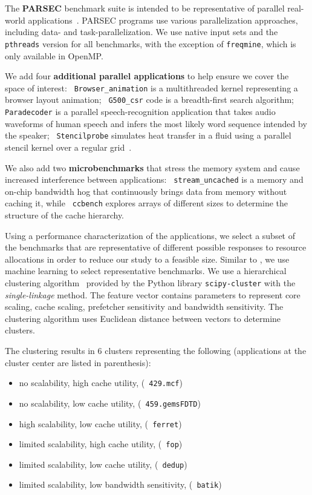 The \textbf{PARSEC} benchmark suite is intended to be representative
of parallel real-world applications~\cite{parsec}. PARSEC
programs use various parallelization approaches, including data- and
task-parallelization. We use native input sets and the \texttt{ pthreads} version for all benchmarks, with the exception of
\texttt{freqmine}, which is only available in OpenMP.

We add four \textbf{additional parallel applications} to help ensure
we cover the space of interest: \texttt{ Browser\_animation} is a
multithreaded kernel representing a browser layout animation; \texttt{
  G500\_csr} code is a breadth-first search algorithm; \texttt{ Paradecoder} is a parallel
speech-recognition application that takes audio waveforms of human
speech and infers the most likely word sequence intended by the
speaker; \texttt{ Stencilprobe} simulates heat transfer in a fluid
using a parallel stencil kernel over a regular
grid~\cite{Kamil:Stencilprobe}.

We also add two \textbf{microbenchmarks} that stress the memory
system and cause increased interference between applications: \texttt{ stream\_uncached} is a memory and on-chip bandwidth hog
that continuously brings data from memory without caching it, while
\texttt{ ccbench} explores arrays of different sizes to determine the
structure of the cache hierarchy.

Using a performance characterization of the applications, we select a subset of the benchmarks that are representative of different possible responses to resource allocations in order to reduce our study to a feasible size.  Similar to \cite{Phansalkar:ISCA2007}, we use machine learning to select representative benchmarks.  We use a
hierarchical clustering algorithm~\cite{Phansalkar:ISCA2007} provided by the Python library \texttt{scipy-cluster} with the \textit{single-linkage} method.  The feature vector contains parameters to represent core scaling, cache scaling, prefetcher sensitivity and bandwidth sensitivity.  The clustering algorithm uses Euclidean distance between vectors to determine clusters.

The clustering results in 6 clusters representing the following (applications at the cluster center are listed in parenthesis):
 \begin{itemize}\itemsep0pt \parskip0pt 
\item no scalability, high cache utility, (\texttt{ 429.mcf})
\item no scalability, low cache utility, (\texttt{ 459.gems\-FDTD})
\item high scalability, low cache utility, (\texttt{ ferret})
\item limited scalability, high cache utility, (\texttt{ fop})
\item limited scalability, low cache utility, (\texttt{ dedup})
\item limited scalability, low bandwidth sensitivity, (\texttt{ batik})
\end{itemize}

